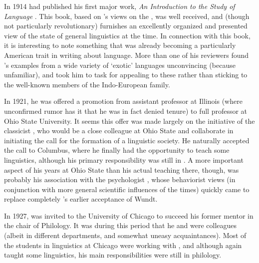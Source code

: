 In 1914 {\Bloomfield} had published his first major work, \textsl{An
  Introduction to the Study of Language}
\citep{bloomfield14:introduction}. This book, based on 's views
on the , was well received, and
(though not particularly revolutionary) furnishes an excellently
organized and presented view of the state of general linguistics at
the time. In connection with this book, it is interesting to note
something that was already becoming a particularly American trait in
writing about language. More than one of his reviewers found
{\Bloomfield}'s examples from a wide variety of `exotic' languages
unconvincing (because unfamiliar), and took him to task for appealing
to these rather than sticking to the well-known members of the
{Indo-European} family.

In 1921, he was offered a promotion from assistant professor at
Illinois (where unconfirmed rumor has it that he was in fact denied
tenure) to full professor at Ohio State University. It seems this
offer was made largely on the initiative of the classicist 
, who would be a close colleague at Ohio State and
collaborate in initiating the call for the formation of a linguistic
society. He naturally accepted the call to Columbus, where he finally
had the opportunity to teach some linguistics, although his primary
responsibility was still in . A more important aspect of his
years at Ohio State than his actual teaching there, though, was
probably his association with the psychologist , whose
behaviorist views (in conjunction with more general scientific
influences of the times) quickly came to replace completely
{\Bloomfield}'s earlier acceptance of Wundt.

In 1927, {\Bloomfield} was invited to the University of Chicago to
succeed his former mentor  in the chair of 
Philology. It was during this period that he and {\Sapir} were colleagues
(albeit in different departments, and somewhat uneasy
acquaintances). Most of the students in linguistics at Chicago were
working with {\Sapir}, and although {\Bloomfield} again taught some
linguistics, his main responsibilities were still in 
philology.

